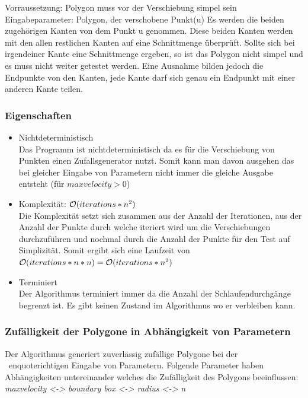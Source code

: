 		Vorraussetzung: Polygon muss vor der Verschiebung simpel sein
		Eingabeparameter: Polygon, der verschobene Punkt(u)
		Es werden die beiden zugehörigen Kanten von dem Punkt u genommen. 
		Diese beiden Kanten werden mit den allen restlichen Kanten auf eine 
		Schnittmenge überprüft. Sollte sich bei irgendeiner Kante eine 
		Schnittmenge ergeben, so ist das Polygon nicht simpel und es muss 
		nicht weiter getestet werden. Eine Ausnahme bilden jedoch die 
		Endpunkte von den Kanten, jede Kante darf sich genau ein Endpunkt mit 
		einer anderen Kante teilen.


	\subsubsection{Eigenschaften}
		\begin{itemize}
			\item Nichtdeterministisch\\
			Das Programm ist nichtdeterministisch da es für die Verschiebung 
			von Punkten einen Zufallsgenerator nutzt. Somit kann man davon 
			ausgehen das bei gleicher Eingabe von Parametern nicht immer die 
			gleiche Ausgabe entsteht (für $maxvelocity > 0$)
			\item Komplexität: $\mathcal{O}(iterations*n^2)$\\
			Die Komplexität setzt sich zusammen aus der Anzahl der 
			Iterationen, aus der Anzahl der Punkte durch welche iteriert wird 
			um die Verschiebungen durchzuführen und nochmal durch die Anzahl 
			der Punkte für den Test auf Simplizität. Somit ergibt sich eine 
			Laufzeit von $\mathcal{O}(iterations*n*n) = \mathcal{O}(iterations*n^2)$
			\item Terminiert\\
			Der Algorithmus terminiert immer da die Anzahl der 
			Schlaufendurchgänge begrenzt ist. Es gibt keinen Zustand im 
			Algorithmus wo er verbleiben kann.
		\end{itemize}


	\subsubsection{Zufälligkeit der Polygone in Abhängigkeit von Parametern}
		Der Algorithmus generiert zuverlässig zufällige Polygone bei der \
		enquote{richtigen} Eingabe von Parametern. Folgende Parameter haben 
		Abhängigkeiten untereinander welches die Zufälligkeit des Polygons 
		beeinflussen:\\
		\textit{maxvelocity <-> boundary box <-> radius <-> n}

